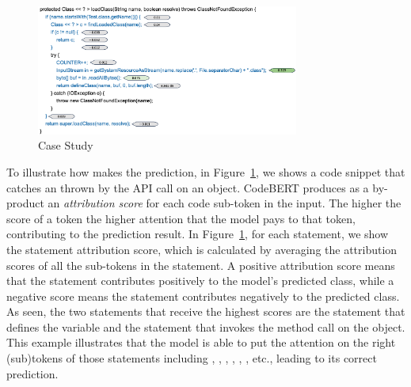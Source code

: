 \begin{figure}[t]
 	\centering
 	\includegraphics[width=3.4in]{rq1-case-study.png}
        \vspace{-20pt}
 	\caption{{\xblock} Case Study}
 	\label{fig:rq1-case}	
\end{figure}

 To illustrate how {\xblock} makes
the prediction, in Figure~\ref{fig:rq1-case}, we shows a code snippet
that catches an  thrown by the 
API call on an  object. CodeBERT produces as a
by-product an {\em attribution score} for each code sub-token in the
input. The higher the score of a token the higher attention that the
model pays to that token, contributing to the prediction result. In
Figure~\ref{fig:rq1-case}, for each statement, we show the statement
attribution score, which is calculated by averaging the attribution
scores of all the sub-tokens in the statement.
%
A positive attribution score means that the statement contributes
positively to the model's predicted class, while a negative score
means the statement contributes negatively to the predicted class.  As
seen, the two statements that receive the highest scores are the
statement that defines the  variable and the
statement that invokes the  method call on the
 object. This example illustrates that the model is
able to put the attention on the right (sub)tokens of those statements
including , , , ,
, , etc., leading to its correct prediction.

